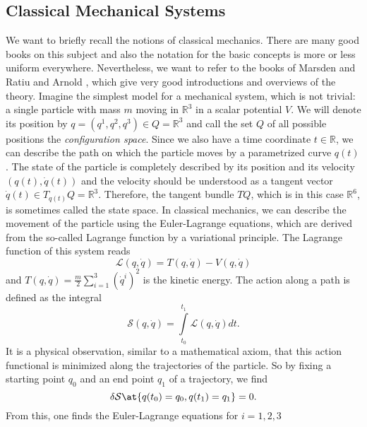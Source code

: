 \subsection{Classical Mechanical Systems}
\label{subsec:chap2_Classical}
We want to briefly recall the notions of classical mechanics. There are many 
good books on this subject and also the notation for the basic concepts is more or 
less uniform everywhere. Nevertheless, we want to refer to the books of Marsden 
and Ratiu \cite{marsden.ratiu:1999a} and Arnold \cite{arnold:1989a}, which give 
very good introductions and overviews of the theory.
Imagine the simplest model for a mechanical system, which is not trivial: a 
single particle with mass $m$ moving in $\mathbb{R}^3$ in a scalar potential $V$. 
We will denote its position by $q = (q^1, q^2, q^3) \in Q = \mathbb{R}^3$ and call 
the set $Q$ of all possible positions the \emph{configuration space}. Since we 
also have a time coordinate $t \in \mathbb{R}$, we can describe the path on which 
the particle moves by a parametrized curve $q(t)$. The state of the particle is 
completely described by its position and its velocity $(q(t), \dot q(t))$ and the 
velocity should be understood as a tangent vector $\dot q(t) \in T_{q(t)}Q = 
\mathbb{R}^3$. Therefore, the tangent bundle $TQ$, which is in this case 
$\mathbb{R}^6$, is sometimes called the state space. In classical mechanics, we 
can describe the movement of the particle using the Euler-Lagrange equations, 
which are derived from the so-called Lagrange function by a variational principle. 
The Lagrange function of this system reads
\begin{equation*}
	\mathcal{L}(q, \dot q)
	=
	T(q, \dot q) - V(q, \dot q)
\end{equation*}
and $T(q, \dot q) = \frac{m}{2}  \sum_{i=1}^3 \left( \dot{q}^i \right)^2$ is the 
kinetic energy. The action along a path is defined as the integral
\begin{equation*}
	\mathcal{S}(q, \dot q)
	=
	\int\limits_{t_0}^{t_1}
	\mathcal{L}(q, \dot q)
	dt.
\end{equation*}
It is a physical observation, similar to a mathematical axiom, that this action 
functional is minimized along the trajectories of the particle. So by fixing a 
starting point $q_0$ and an end point $q_1$ of a trajectory, we find
\begin{equation*}
	\delta \mathcal{S}
	\at{q(t_0) = q_0, q(t_1) = q_1}
	=
	0.
\end{equation*}
From this, one finds the Euler-Lagrange equations for $i = 1, 2, 3$
